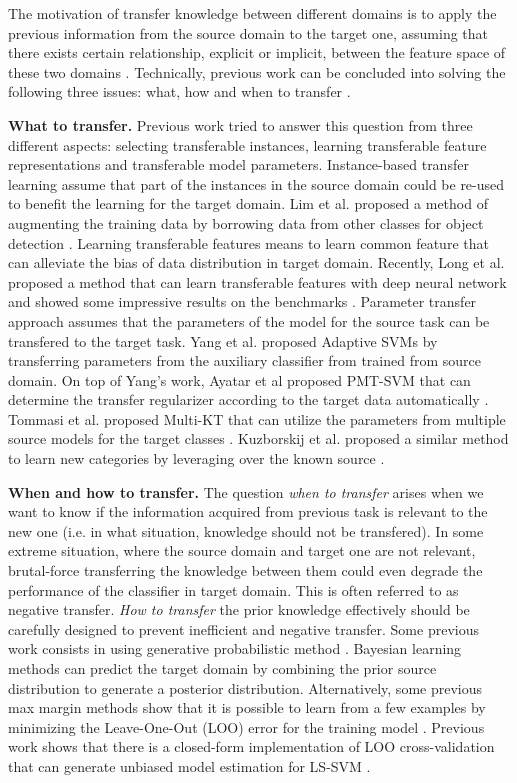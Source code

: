 The motivation of transfer knowledge between different domains is to apply the previous information from the source domain to the target one, assuming that there exists certain relationship, explicit or implicit, between the  feature space of these two domains \cite{pan2010survey}. Technically, previous work can be concluded into solving the following three issues: what, how and when to transfer \cite{tommasi2014learning}.


\textbf{What to transfer.} Previous work tried to answer this question from three different aspects: selecting transferable instances, learning transferable feature representations and transferable model parameters. Instance-based transfer learning assume that part of the instances in the source domain could be re-used to benefit the learning for the target domain. Lim et al. proposed a method of augmenting the training data by borrowing data from other classes for object detection \cite{lim2012transfer}. Learning transferable features means to learn common feature that can alleviate the bias of data distribution in target domain. Recently, Long et al. proposed a method that can learn transferable features with deep neural network and showed some impressive results on the  benchmarks \cite{LongICML15}. Parameter transfer
approach assumes that the parameters of the model for the source task can be transfered to the target task. Yang et al. proposed Adaptive SVMs by transferring parameters from the auxiliary classifier from trained from source domain\cite{yang2007cross}. On top of Yang's work, Ayatar et al proposed PMT-SVM that can determine the transfer regularizer according to the target data automatically \cite{aytar2011tabula}. Tommasi et al. proposed Multi-KT that can utilize the parameters from multiple source models for the target classes  \cite{tommasi2014learning}.
Kuzborskij et al. proposed a similar method to learn new categories by leveraging over the known source \cite{kuzborskij2013n}.

\textbf{When and how to transfer.} The question \textit{when to transfer} arises when we want to know if the information acquired from previous task is relevant to the new one (i.e. in what situation, knowledge should not be transfered). In some extreme situation, where the source domain and target one are not relevant, brutal-force transferring the knowledge between them could even degrade the performance of the classifier in target domain. This is often referred to as negative transfer. \textit{How to transfer} the prior knowledge effectively should be carefully designed to prevent inefficient and negative transfer. Some previous work consists in using generative probabilistic method \cite{davis2009deep} \cite{wang2014active} \cite{zhou2014multi}.  Bayesian learning methods can predict the target domain by combining the prior source distribution to generate a posterior distribution. Alternatively, some previous max margin methods show that it is possible to learn from a few examples by minimizing the  Leave-One-Out (LOO) error for the training model \cite{kuzborskij2013n} \cite{tommasi2010safety}. Previous work shows that there is a closed-form implementation of LOO cross-validation that can generate unbiased model estimation for LS-SVM \cite{cawley2006leave}.

